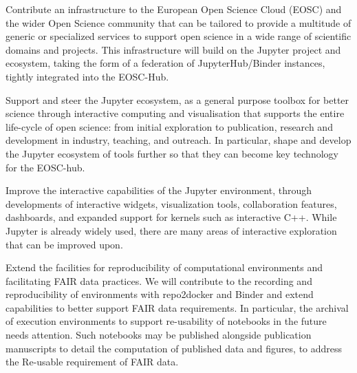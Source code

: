 \begin{compactenum}

\item \label{obj:deployment} %
  Contribute an infrastructure to the European Open Science Cloud
  (EOSC) and the wider Open Science community that can be tailored to
  provide a multitude of generic or specialized services to support
  open science in a wide range of scientific domains and projects.
  This infrastructure will build on the Jupyter project and ecosystem,
  taking the form of a federation of JupyterHub/Binder instances,
  tightly integrated into the EOSC-Hub.

\item \label{obj:jupyter} %
  Support and steer the Jupyter ecosystem, as a general purpose
  toolbox for better science through interactive computing and
  visualisation that supports the entire life-cycle of open science:
  from initial exploration to publication, research and development in
  industry, teaching, and outreach. In particular, shape and develop
  the Jupyter ecosystem of tools further so that they can become key
  technology for the EOSC-hub.

\item \label{obj:interactivity} %
  Improve the interactive capabilities of the Jupyter environment,
  through developments of interactive widgets,
  visualization tools, collaboration features, dashboards,
  and expanded support for kernels such as interactive C++.
  While Jupyter is already widely used, there are many areas
  of interactive exploration that can be improved upon.

\item \label{obj:reusability} %
  Extend the facilities for reproducibility of computational environments
  and facilitating FAIR data practices.
  We will contribute to the recording and reproducibility
  of environments with repo2docker and Binder
  and extend capabilities to better support FAIR
  data requirements. In particular, the archival of execution
  environments to support re-usability of notebooks in the future
  needs attention. Such notebooks may be published alongside
  publication manuscripts to detail the computation of published data
  and figures, to address the Re-usable requirement of FAIR data.


\end{compactenum}
